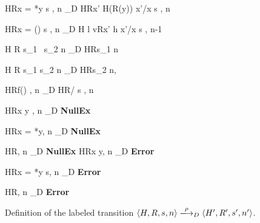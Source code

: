 \begin{figure}[p]
\begin{minipage}{\textwidth}
{\langle H\coma R\coma  \LET x = *y \; \IN s , n \rangle
  \longrightarrow_{D}
  \langle H\coma R\Lfc x' \rightarrow H(R(y)) \Rfc \coma   \Lb x'/x \Rb s , n  \rangle }

{\langle H\coma R\coma  \LET x = \Malloc() \; \IN s , n \rangle
  \xlongrightarrow{\Malloc}_{D}
  \langle H \Lfc l \rightarrow v\Rfc \coma R\Lfc x' \rightarrow h \Rfc \coma   \Lb x'/x \Rb s , n-1  \rangle }

{\langle H \coma R \coma \IFNULL\Cirx   \THEN   s_{1} \ELSE\  s_{2} \coma  n \rangle
  \longrightarrow_{D}
  \langle H\coma R\coma s_{1} \coma n \rangle}

{\langle H \coma R \coma \IFNULL\Cirx \THEN  s_{1} \ELSE  s_{2} \coma  n \rangle
  \longrightarrow_{D}
  \langle H\coma R\coma s_{2} \coma  n, \rangle}

{ \langle H\coma R\coma  f() , n \rangle
  \longrightarrow_{D}
  \langle H\coma R\coma  \Lb {}/ \Rb s , n \rangle}

{\langle H\coma R\coma  *x \leftarrow y , n \rangle
  \longrightarrow_{D} \bf NullEx }

  {\langle H\coma R\coma  x = *y, n \rangle
    \longrightarrow_{D}
    \bf NullEx }

  {\langle H\coma R\coma  \FREE , n \rangle
    \xlongrightarrow{\Free}_{D} \bf NullEx  }
{\langle H\coma R\coma   *x \leftarrow y,  n \rangle
  \longrightarrow_{D}
  \bf  Error }

{\langle H\coma R\coma  \LET x  = *y \; \IN s, n \rangle
  \longrightarrow_{D}
  \bf  Error }

{\langle H\coma R\coma  \FREE , n \rangle
  \xlongrightarrow{\Free}_{D}
  \bf Error }


\end{minipage}

\caption{Definition of the labeled transition \(\langle H, R, s, n
  \rangle \xlongrightarrow{\rho}_D \langle H', R', s', n' \rangle\).}
\label{fig:transitionRules}
\end{figure}


